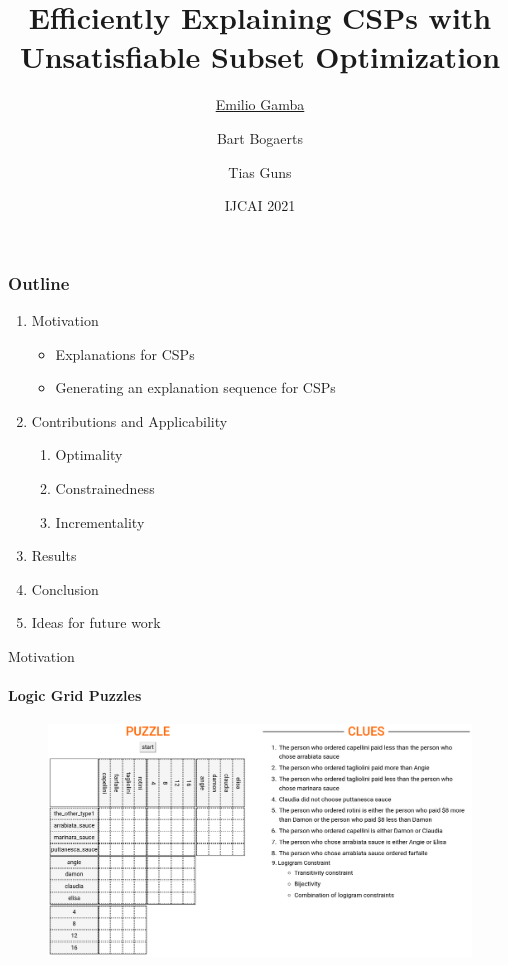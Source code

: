 \documentclass{beamer}
\title{Efficiently Explaining CSPs with Unsatisfiable Subset Optimization}
\institute[shortinst]
{\inst{1} Vrije Universiteit Brussel, Belgium \\ %
\inst{2} KULeuven, Belgium \\ %
\href{mailto:emilio.gamba@vub.be}{\underline{emilio.gamba@vub.be}}, \href{mailto:bart.bogaerts@vub.be}{bart.bogaerts@vub.be}, \href{mailto:tias.guns@kuleuven.be}{tias.guns@kuleuven.be} %
}
\date{IJCAI 2021}
\author{\underline{Emilio Gamba}\inst{1} \and  Bart Bogaerts\inst{1} \and   Tias Guns\inst{1,2}}
\begin{document}
\begin{frame}
    \maketitle
    \vspace{-2.5cm}
\end{frame}


\begin{frame}
	\frametitle{Outline}
	\begin{enumerate}
		\item Motivation
		\begin{itemize}
			\item Explanations for CSPs
			\item Generating an explanation sequence for CSPs
		\end{itemize}
		\item Contributions and Applicability
		\begin{enumerate}
			\item Optimality
			\item Constrainedness
			\item Incrementality
		\end{enumerate}
	\item Results
	\item Conclusion
	
	\item Ideas for future work
	\end{enumerate}
\end{frame}

\begin{frame}{Motivation}
	\framesubtitle{Logic Grid Puzzles}
	\begin{figure}
		\includegraphics[width=\textwidth]{logicpuzzles.png}
	\end{figure}
\end{frame}
\end{document}
